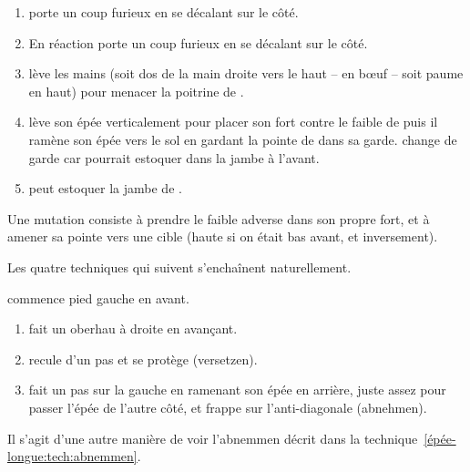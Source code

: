 \begin{technique}[Mutation]

\begin{enumerate}
	\item \A porte un coup furieux en se décalant sur le côté.
	
	\item En réaction \D porte un coup furieux en se décalant sur le côté.
	
	\item \D lève les mains (soit dos de la main droite vers le haut – en bœuf – soit paume en haut) pour menacer la poitrine de \A.
	
	\item \A lève son épée verticalement pour placer son fort contre le faible de \D puis il ramène son épée vers le sol en gardant la pointe de \D dans sa garde. \A change de garde car \D pourrait estoquer dans la jambe à l'avant.
	
	\item \A peut estoquer la jambe de \D.
\end{enumerate}

Une mutation consiste à prendre le faible adverse dans son propre fort, et à amener sa pointe vers une cible (haute si on était bas avant, et inversement).

\end{technique}

\bigskip

Les quatre techniques qui suivent s'enchaînent naturellement.


\begin{technique}
\label{épée-longue:tech:dg-zufechten-abnemmen}

\A commence pied gauche en avant.

\begin{enumerate}
	\item \A fait un oberhau à droite en avançant.
	\item \D recule d'un pas et se protège (versetzen).
	\item \A fait un pas sur la gauche en ramenant son épée en arrière, juste assez pour passer l'épée de l'autre côté, et frappe sur l'anti-diagonale (abnehmen).
\end{enumerate}

Il s'agit d'une autre manière de voir l'abnemmen décrit dans la technique~\ref{épée-longue:tech:abnemmen}.

\end{technique}


